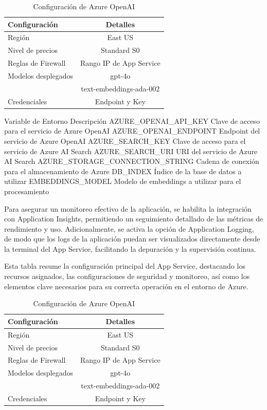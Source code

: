 \begin{table}[h]
	\centering
	\caption[Configuración de Azure OpenAI]{Configuración de Azure OpenAI}
	\begin{tabular}{l c}    
		\toprule
		\textbf{Configuración} 	 & \textbf{Detalles} 	\\
		\midrule
		Región              &	East US 				        \\		
		Nivel de precios    & Standard S0				      \\
		Reglas de Firewall  & Rango IP de App Service \\
    Modelos desplegados	& gpt-4o				          \\
            	          & text-embeddings-ada-002	\\
    Credenciales	      & Endpoint y Key 		      \\
		\bottomrule
		\hline
	\end{tabular}
	\label{tab:config-openai}
\end{table}

Variable de Entorno	Descripción
AZURE_OPENAI_API_KEY	Clave de acceso para el servicio de Azure OpenAI
AZURE_OPENAI_ENDPOINT	Endpoint del servicio de Azure OpenAI
AZURE_SEARCH_KEY	Clave de acceso para el servicio de Azure AI Search
AZURE_SEARCH_URI	URI del servicio de Azure AI Search
AZURE_STORAGE_CONNECTION_STRING	Cadena de conexión para el almacenamiento de Azure
DB_INDEX	Índice de la base de datos a utilizar
EMBEDDINGS_MODEL	Modelo de embeddings a utilizar para el procesamiento

Para asegurar un monitoreo efectivo de la aplicación, se habilita la integración con Application Insights, permitiendo un seguimiento detallado de las métricas de rendimiento y uso. Adicionalmente, se activa la opción de Application Logging, de modo que los logs de la aplicación puedan ser visualizados directamente desde la terminal del App Service, facilitando la depuración y la supervisión continua.

Esta tabla resume la configuración principal del App Service, destacando los recursos asignados, las configuraciones de seguridad y monitoreo, así como los elementos clave necesarios para su correcta operación en el entorno de Azure.

\begin{table}[h]
	\centering
	\caption[Configuración de Azure OpenAI]{Configuración de Azure OpenAI}
	\begin{tabular}{l c}    
		\toprule
		\textbf{Configuración} 	 & \textbf{Detalles} 	\\
		\midrule
		Región              &	East US 				        \\		
		Nivel de precios    & Standard S0				      \\
		Reglas de Firewall  & Rango IP de App Service \\
    Modelos desplegados	& gpt-4o				          \\
            	          & text-embeddings-ada-002	\\
    Credenciales	      & Endpoint y Key 		      \\
		\bottomrule
		\hline
	\end{tabular}
	\label{tab:config-openai}
\end{table}

